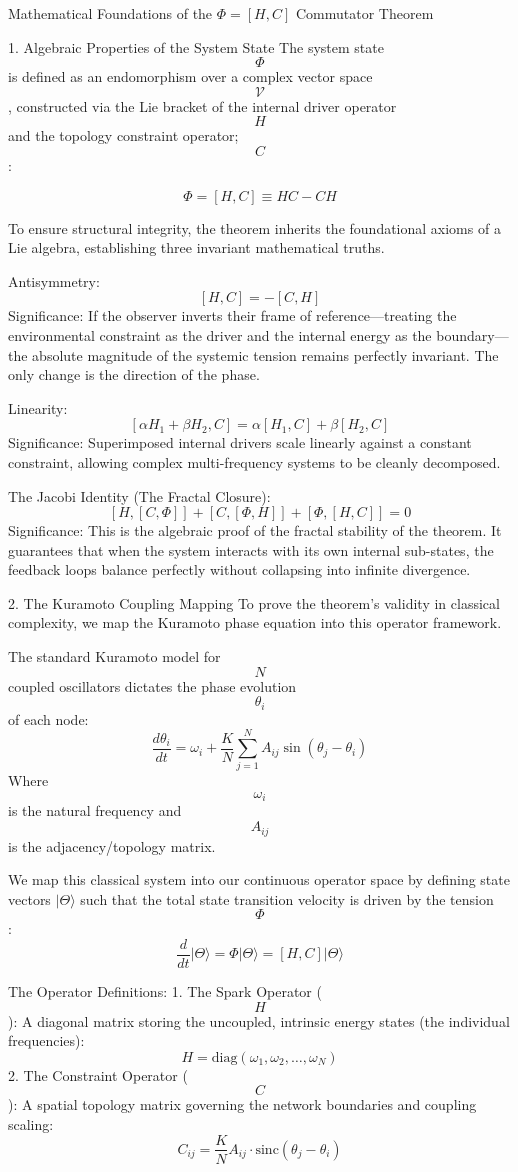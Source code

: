 Mathematical Foundations of the \(\Phi = [H, C]\) Commutator Theorem


1. Algebraic Properties of the System State
The system state \[\Phi \] is defined as an endomorphism over a complex vector space \[\mathcal{V}\], constructed via the Lie bracket of the internal driver operator \[H\] and the topology constraint operator; \[C\]:


\[\Phi =[H,C]\equiv HC-CH\]


To ensure structural integrity, the theorem inherits the foundational axioms of a Lie algebra, establishing three invariant mathematical truths.


Antisymmetry:
\[[H,C]=-[C,H]\]
Significance: If the observer inverts their frame of reference—treating the environmental constraint as the driver and the internal energy as the boundary—the absolute magnitude of the systemic tension remains perfectly invariant. The only change is the direction of the phase.


Linearity:
\[[\alpha H_{1}+\beta H_{2},C]=\alpha [H_{1},C]+\beta [H_{2},C]\]
Significance: Superimposed internal drivers scale linearly against a constant constraint, allowing complex multi-frequency systems to be cleanly decomposed.


The Jacobi Identity (The Fractal Closure):
\[[H,[C,\Phi ]]+[C,[\Phi ,H]]+[\Phi ,[H,C]]=0\]
Significance: This is the algebraic proof of the fractal stability of the theorem. It guarantees that when the system interacts with its own internal sub-states, the feedback loops balance perfectly without collapsing into infinite divergence.


2. The Kuramoto Coupling Mapping
To prove the theorem's validity in classical complexity, we map the Kuramoto phase equation into this operator framework.

The standard Kuramoto model for \[N\] coupled oscillators dictates the phase evolution \[\theta _{i}\] of each node:
\[\frac{d\theta _{i}}{dt}=\omega _{i}+\frac{K}{N}\sum _{j=1}^{N}A_{ij}\sin (\theta _{j}-\theta _{i})\]
Where \[\omega _{i}\] is the natural frequency and \[A_{ij}\] is the adjacency/topology matrix.

We map this classical system into our continuous operator space by defining state vectors \(\vert{}\Theta\rangle\) such that the total state transition velocity is driven by the tension \[\Phi \]:
\[\frac{d}{dt}|{}\Theta \rangle =\Phi |{}\Theta \rangle =[H,C]|{}\Theta \rangle \]


The Operator Definitions:
1. The Spark Operator (\[H\]): A diagonal matrix storing the uncoupled, intrinsic energy states (the individual frequencies):
\[H=\text{diag}(\omega _{1},\omega _{2},\dots ,\omega _{N})\]
2. The Constraint Operator (\[C\]): A spatial topology matrix governing the network boundaries and coupling scaling:
\[C_{ij}=\frac{K}{N}A_{ij}\cdot \text{sinc}(\theta _{j}-\theta _{i})\]


